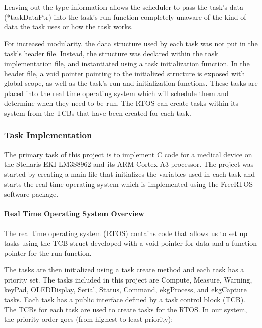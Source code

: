 \documentclass[12pt]{article} %
\begin{document}
    Leaving out the type information allows the scheduler to pass the task's data
    (*taskDataPtr) into the task's run function completely unaware of the kind of
    data the task uses or how the task works.

    For increased modularity, the data structure used by each task was not put in
    the task's header file. Instead, the structure was declared within the task
		implementation file, and instantiated using a task initialization function. In
		the header file, a void pointer pointing to the initialized structure is
		exposed with global scope, as well as the task's run and initialization functions.
		These tasks are placed into the real time operating system which will schedule
		them and determine when they need to be run.
		The RTOS can create tasks within its system from the TCBs that have been
		created for each task.

		\subsubsection{Task Implementation}


		The primary task of this project is to implement C code for a medical
		device on the Stellaris EKI-LM3S8962 and its ARM Cortex A3 processor. The
		project was started by creating a main file that initializes the variables
		used in each task and starts the real time operating system which is
		implemented using the FreeRTOS software package. 

		\paragraph{Real Time Operating System Overview}
		The real time operating system (RTOS) contains code that allows us to set up
		tasks using the TCB struct developed with a void pointer for data and a
		function pointer for the run function.

		The tasks are then initialized using a task create method and each task has a
		priority set. The tasks included in this project are Compute, Measure, Warning,
		keyPad, OLEDDisplay, Serial, Status, Command, ekgProcess, and ekgCapture tasks.
		Each task has a public interface defined by a task control block (TCB). The TCBs for each
		task are used to create tasks for the RTOS. In our system, the priority order
		goes (from highest to least priority): 		
		
\end{document}
